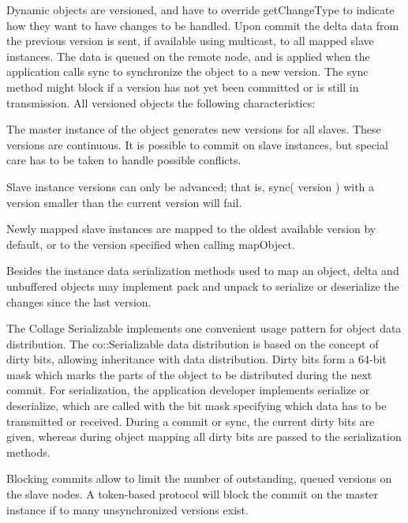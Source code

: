 \documentclass[10pt,journal,compsoc]{IEEEtran}
\begin{document}
Dynamic objects are versioned, and have to override \textsf{getChangeType} to
indicate how they want to have changes to be handled. Upon \textsf{commit} the
delta data from the previous version is sent, if available using multicast, to
all mapped slave instances. The data is queued on the remote node, and is
applied when the application calls \textsf{sync} to synchronize the object to a
new version. The \textsf{sync} method might block if a version has not yet been
committed or is still in transmission. All versioned objects the following
characteristics:

\begin{compactitem}
\item The master instance of the object generates new versions for all
  slaves. These versions are continuous. It is possible to commit on slave
  instances, but special care has to be taken to handle possible
  conflicts.
\item Slave instance versions can only be advanced; that is, \textsf{sync(
  version )} with a version smaller than the current version will fail.
\item Newly mapped slave instances are mapped to the oldest available
  version by default, or to the version specified when calling
  \textsf{mapObject}.
\end{compactitem}

Besides the instance data serialization methods used to map an object, delta and
unbuffered objects may implement \textsf{pack} and \textsf{unpack} to serialize
or deserialize the changes since the last version.

\label{sec:Serializable}The \textsf{Collage} Serializable implements one
convenient usage
pattern for object data distribution. The \textsf{co::Serializable} data
distribution is based on the concept of dirty bits, allowing inheritance with
data distribution. Dirty bits form a 64-bit mask which marks the parts of the
object to be distributed during the next commit. For serialization, the
application developer implements \textsf{serialize} or \textsf{deserialize},
which are called with the bit mask specifying which data has to be transmitted
or received. During a commit or sync, the current dirty bits are given, whereas
during object mapping all dirty bits are passed to the serialization methods.

Blocking commits allow to limit the number of outstanding, queued versions on
the slave nodes. A token-based protocol will block the commit on the master
instance if to many unsynchronized versions exist.
\end{document}
